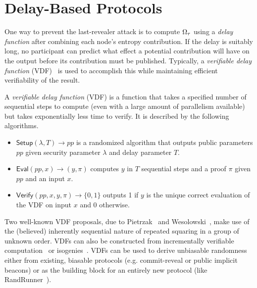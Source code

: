 
\section{Delay-Based Protocols}
\label{section:delay}
One way to prevent the last-revealer attack is to compute $\Omega_\tau$ using a \emph{delay function} after combining each node's entropy contribution. If the delay is suitably long, no participant can predict what effect a potential contribution will have on the output before its contribution must be published. Typically, a \emph{verifiable delay function} (VDF)~\cite{boneh2018verifiable,boneh2018survey} is used to accomplish this while maintaining efficient verifiability of the result.

\begin{definition}
A \textit{verifiable delay function} (VDF) is a function that takes a specified number of sequential steps to compute (even with a large amount of parallelism available) but takes exponentially less time to verify. It is described by the following algorithms.
\begin{itemize}
\item $\mathsf{Setup}(\lambda, T) \rightarrow pp$ is a randomized algorithm that outputs public parameters $pp$ given security parameter $\lambda$ and delay parameter $T$.
\item $\mathsf{Eval}(pp, x) \rightarrow (y, \pi)$ computes $y$ in $T$ sequential steps and a proof $\pi$ given $pp$ and an input $x$.
\item $\mathsf{Verify}(pp, x, y, \pi) \rightarrow \{0, 1\}$ outputs 1 if $y$ is the unique correct evaluation of the VDF on input $x$ and 0 otherwise.
\end{itemize}
\end{definition}

Two well-known VDF proposals, due to Pietrzak~\cite{pietrzak2018simple} and Wesolowski~\cite{wesolowski2019efficient}, make use of the (believed) inherently sequential nature of repeated squaring in a group of unknown order.
VDFs can also be constructed from incrementally verifiable computation~\cite{boneh2018verifiable,khovratovich2022minroot} or isogenies~\cite{de2019verifiable}.
VDFs can be used to derive unbiasable randomness either from existing, biasable protocols (e.g. commit-reveal or public implicit beacons) or as the building block for an entirely new protocol (like RandRunner~\cite{schindler2021randrunner}).

